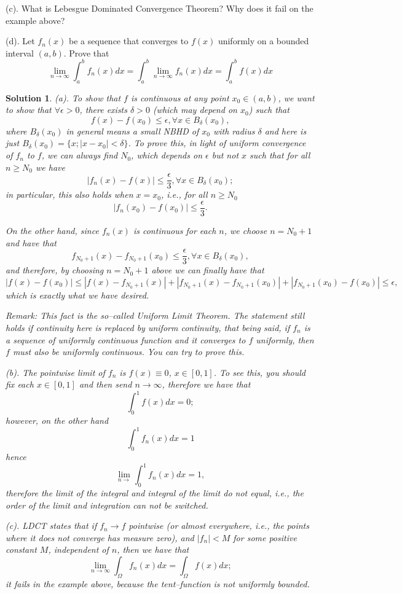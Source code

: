 \documentclass[6pt]{article}
\newtheorem{solution}{Solution}
\numberwithin{equation}{section}
\begin{document}
\begin{enumerate}
(c).  What is Lebesgue Dominated Convergence Theorem? Why does it fail on the example above?

(d).  Let $f_n(x)$ be a sequence that converges to $f(x)$ uniformly on a bounded interval $(a,b)$.  Prove that
\[\lim_{n\rightarrow \infty} \int_a^b f_n(x)dx=\int_a^b \lim_{n\rightarrow \infty} f_n(x)dx=\int_a^b f (x)dx\]
\begin{solution}
(a).  To show that $f$ is continuous at any point $x_0\in(a,b)$, we want to show that $\forall \epsilon>0$, there exists $\delta>0$ (which may depend on $x_0$) such that
\[f(x)-f(x_0)\leq \epsilon, \forall x\in B_\delta(x_0),\]
where $B_\delta(x_0)$ in general means a small NBHD of $x_0$ with radius $\delta$ and here is just $B_\delta(x_0)=\{x;|x-x_0|<\delta\}$.  To prove this, in light of uniform convergence of $f_n$ to $f$, we can always find $N_0$, which depends on $\epsilon$ but not $x$ such that for all $n\geq N_0$ we have
\[|f_n(x)-f(x)|\leq \frac{\epsilon}{3},\forall x\in B_\delta(x_0);\]
in particular, this also holds when $x=x_0$, i.e., for all $n\geq N_0$
\[|f_n(x_0)-f(x_0)|\leq \frac{\epsilon}{3}.\]

On the other hand, since $f_n(x)$ is continuous for each $n$, we choose $n=N_0+1$ and have that
\[f_{N_0+1}(x)-f_{N_0+1}(x_0)\leq \frac{\epsilon}{3},\forall x\in B_\delta(x_0),\]
and therefore, by choosing $n=N_0+1$ above we can finally have that
\[|f(x)-f(x_0)|\leq |f(x)-f_{N_0+1}(x)|+|f_{N_0+1}(x)-f_{N_0+1}(x_0)|+|f_{N_0+1}(x_0)-f(x_0)|\leq \epsilon,\]
which is exactly what we have desired.

Remark:  This fact is the so--called Uniform Limit Theorem.  The statement still holds if continuity here is replaced by uniform continuity, that being said, if $f_n$ is a sequence of uniformly continuous function and it converges to $f$ uniformly, then $f$ must also be uniformly continuous.  You can try to prove this.

(b).  The pointwise limit of $f_n$ is $f(x)\equiv 0$, $x\in[0,1]$.  To see this, you should fix each $x\in[0,1]$ and then send $n\rightarrow \infty$, therefore we have that
\[\int_0^1f(x)dx=0;\]
however, on the other hand
\[\int_0^1 f_n(x)dx=1\]
hence
\[\lim_{n\rightarrow}\int_0^1 f_n(x)dx=1,\]
therefore the limit of the integral and integral of the limit do not equal, i.e., the order of the limit and integration can not be switched.

(c).  LDCT states that if $f_n\rightarrow f $ pointwise (or almost everywhere, i.e., the points where it does not converge has \emph{measure} zero), and $|f_n|<M$ for some positive constant $M$, independent of $n$, then we have that
\[\lim_{n\rightarrow \infty}\int_\Omega f_n(x)dx=\int_\Omega f(x)dx;\]
it fails in the example above, because the tent--function is not uniformly bounded.


\end{solution}
\end{enumerate}
\end{document}
